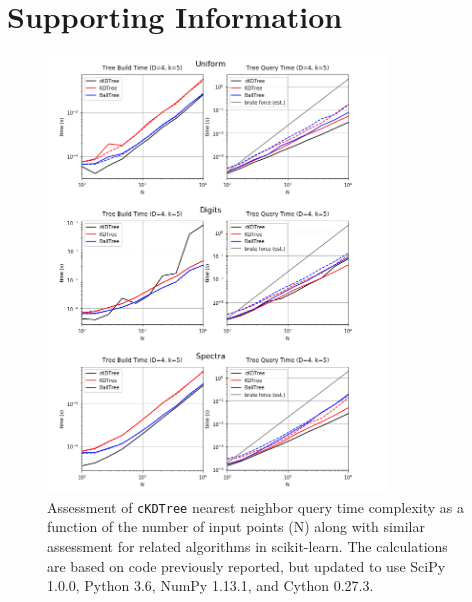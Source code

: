 \documentclass[fleqn,10pt]{wlscirep}
\begin{document}
\section*{Supporting Information}

\renewcommand{\thefigure}{S\arabic{figure}}
\renewcommand{\thetable}{S\arabic{table}}
\setcounter{figure}{0}
\setcounter{table}{0}

\begin{figure}[H]
\centering
\includegraphics[width=0.8\textwidth]{supporting_info/knn_complexity_confirm}
\caption{Assessment of \texttt{cKDTree} nearest neighbor query time complexity as a function of the number of input points (N) along with similar assessment for related algorithms in scikit-learn. The calculations are based on code previously reported\cite{knn-jake}, but updated to use SciPy 1.0.0, Python 3.6, NumPy 1.13.1, and Cython 0.27.3.}
\label{fig:knn-complexity}
\end{figure}
\end{document}
